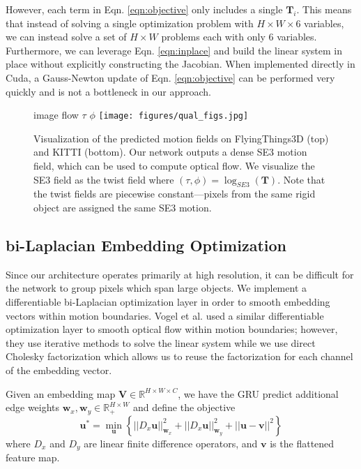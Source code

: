 \documentclass[final]{cvpr}
\begin{document}
However, each term in Eqn. \ref{eqn:objective} only includes a single $\mathbf{T}_i$. This means that instead of solving a single optimization problem with $H \times W \times 6$ variables, we can instead solve a set of $H \times W$ problems each with only $6$ variables. Furthermore, we can leverage Eqn. \ref{eqn:inplace} and build the linear system in place without explicitly constructing the Jacobian. When implemented directly in Cuda, a Gauss-Newton update of Eqn. \ref{eqn:objective} can be performed very quickly and is not a bottleneck in our approach.

\begin{figure*}
    \small \hspace{-8mm} image \hspace{28mm} flow \hspace{30mm} $\tau$ \hspace{30mm} $\phi$
    \centering
    \texttt{[image: figures/qual\_figs.jpg]}
    \caption{Visualization of the predicted motion fields on FlyingThings3D (top) and KITTI (bottom). Our network outputs a dense SE3 motion field,  which can be used to compute optical flow. We visualize the SE3 field as the twist field where $(\tau, \phi) = \log_{SE3}(\mathbf{T})$. Note that the twist fields are piecewise constant---pixels from the same rigid object are assigned the same SE3 motion.}
    \label{fig:examples}
\end{figure*}



\subsection{bi-Laplacian Embedding Optimization}
Since our architecture operates primarily at high resolution, it can be difficult for the network to group pixels which span large objects. We implement a differentiable bi-Laplacian optimization layer in order to smooth embedding vectors within motion boundaries. Vogel et al. \cite{vogel2018learning} used a similar differentiable optimization layer to smooth optical flow within motion boundaries; however, they use iterative methods to solve the linear system while we use direct Cholesky factorization which allows us to reuse the factorization for each channel of the embedding vector.

Given an embedding map $\mathbf{V} \in \mathbb{R}^{H \times W \times C}$, we have the GRU predict additional edge weights $\mathbf{w}_x, \mathbf{w}_y \in \mathbb{R}_+^{H \times W}$ and define the objective
\begin{equation}
    \mathbf{u}^* = \min_\mathbf{u} \left\{ ||D_x \mathbf{u}||_{\mathbf{w}_x}^2 + ||D_x \mathbf{u}||_{\mathbf{w}_y}^2 + ||\mathbf{u} - \mathbf{v}||^2 \right\}
    \label{eqn:bilaplacian}
\end{equation}
where $D_x$ and $D_y$ are linear finite difference operators, and $\mathbf{v}$ is the flattened feature map. 
\end{document}
